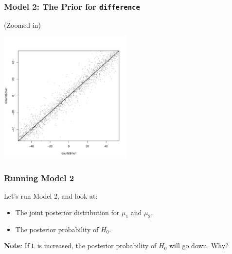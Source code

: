 \documentclass{beamer}
\begin{document}
\begin{frame}[fragile]
\frametitle{Model 2: The Prior for \texttt{difference}}
(Zoomed in)
\begin{center}
\includegraphics[width=0.5\textwidth]{images/ttest_prior2.pdf}
\end{center}

\end{frame}


\begin{frame}[fragile]
\frametitle{Running Model 2}
Let's run Model 2, and look at:\pause

\begin{itemize}
\item The joint posterior distribution for $\mu_1$ and $\mu_2$.\pause
\item The posterior probability of $H_0$.\pause
\end{itemize}

{\bf Note}: If \texttt{L} is increased, the posterior probability of
$H_0$ will go down. Why?
\end{frame}
\end{document}
